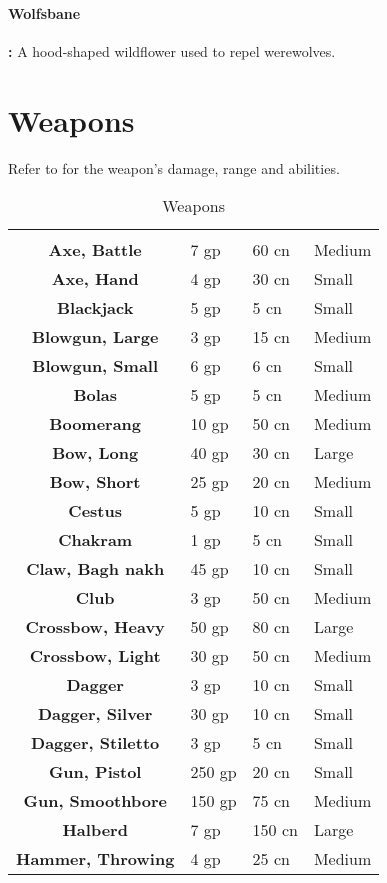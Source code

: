 \begin{multicols*}{2}
\paragraph{Wolfsbane}\label{eq:Wolfsbane}\textbf{:} A hood-shaped wildflower used to repel werewolves.

\section{Weapons}
Refer to  for the weapon’s damage, range and abilities.

\begin {table}[H]
  \caption{Weapons}
  \begin{tabularx}{\columnwidth}{>{\bfseries}cYYY}
		 &  &  & \\
		Axe, Battle & 7 gp & 60 cn & Medium\\
		Axe, Hand & 4 gp & 30 cn & Small\\
		Blackjack & 5 gp & 5 cn & Small\\
		Blowgun, Large & 3 gp & 15 cn & Medium\\
		Blowgun, Small & 6 gp & 6 cn & Small\\
		Bolas & 5 gp & 5 cn & Medium\\
		Boomerang & 10 gp & 50 cn & Medium\\
		Bow, Long & 40 gp & 30 cn & Large\\
		Bow, Short & 25 gp & 20 cn & Medium\\
		Cestus & 5 gp & 10 cn & Small\\
		Chakram & 1 gp & 5 cn & Small\\
		Claw, Bagh nakh & 45 gp & 10 cn & Small\\
		Club & 3 gp & 50 cn & Medium\\
		Crossbow, Heavy & 50 gp & 80 cn & Large\\
		Crossbow, Light & 30 gp & 50 cn & Medium\\
		Dagger & 3 gp & 10 cn & Small\\
		Dagger, Silver & 30 gp & 10 cn & Small\\
		Dagger, Stiletto & 3 gp & 5 cn & Small\\
		Gun, Pistol & 250 gp & 20 cn & Small\\
		Gun, Smoothbore & 150 gp & 75 cn & Medium\\
		Halberd & 7 gp & 150 cn & Large\\
		Hammer, Throwing & 4 gp & 25 cn & Medium\\

\end{tabularx}
\end{table}
\end{multicols*}
